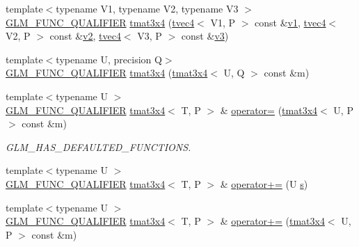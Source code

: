 \begin{DoxyCompactItemize}
\item 
{\footnotesize template$<$typename V1, typename V2, typename V3 $>$ }\\\mbox{\hyperlink{setup_8hpp_a33fdea6f91c5f834105f7415e2a64407}{G\+L\+M\+\_\+\+F\+U\+N\+C\+\_\+\+Q\+U\+A\+L\+I\+F\+I\+ER}} \mbox{\hyperlink{structglm_1_1tmat3x4_a9388a3a74c10e23d0fd00611b04d1fd0}{tmat3x4}} (\mbox{\hyperlink{structglm_1_1tvec4}{tvec4}}$<$ V1, P $>$ const \&\mbox{\hyperlink{glad_8h_a0779c3b73f9aa3a0ac5b0139b5d291d9}{v1}}, \mbox{\hyperlink{structglm_1_1tvec4}{tvec4}}$<$ V2, P $>$ const \&\mbox{\hyperlink{glad_8h_a9a09a1837922b2b806f4589096a52049}{v2}}, \mbox{\hyperlink{structglm_1_1tvec4}{tvec4}}$<$ V3, P $>$ const \&\mbox{\hyperlink{glad_8h_acc806b31cbf466ceba6555983d8b814d}{v3}})
\item 
{\footnotesize template$<$typename U, precision Q$>$ }\\\mbox{\hyperlink{setup_8hpp_a33fdea6f91c5f834105f7415e2a64407}{G\+L\+M\+\_\+\+F\+U\+N\+C\+\_\+\+Q\+U\+A\+L\+I\+F\+I\+ER}} \mbox{\hyperlink{structglm_1_1tmat3x4_a1117842438c01204536f3829257eaa12}{tmat3x4}} (\mbox{\hyperlink{structglm_1_1tmat3x4}{tmat3x4}}$<$ U, Q $>$ const \&m)
\item 
{\footnotesize template$<$typename U $>$ }\\\mbox{\hyperlink{setup_8hpp_a33fdea6f91c5f834105f7415e2a64407}{G\+L\+M\+\_\+\+F\+U\+N\+C\+\_\+\+Q\+U\+A\+L\+I\+F\+I\+ER}} \mbox{\hyperlink{structglm_1_1tmat3x4}{tmat3x4}}$<$ T, P $>$ \& \mbox{\hyperlink{structglm_1_1tmat3x4_a819a25fbfbbf505d7304adec59824063}{operator=}} (\mbox{\hyperlink{structglm_1_1tmat3x4}{tmat3x4}}$<$ U, P $>$ const \&m)
\begin{DoxyCompactList}\small\item\em G\+L\+M\+\_\+\+H\+A\+S\+\_\+\+D\+E\+F\+A\+U\+L\+T\+E\+D\+\_\+\+F\+U\+N\+C\+T\+I\+O\+NS. \end{DoxyCompactList}\item 
{\footnotesize template$<$typename U $>$ }\\\mbox{\hyperlink{setup_8hpp_a33fdea6f91c5f834105f7415e2a64407}{G\+L\+M\+\_\+\+F\+U\+N\+C\+\_\+\+Q\+U\+A\+L\+I\+F\+I\+ER}} \mbox{\hyperlink{structglm_1_1tmat3x4}{tmat3x4}}$<$ T, P $>$ \& \mbox{\hyperlink{structglm_1_1tmat3x4_a1a06efd807d1d694d6c3d6c25227f6f5}{operator+=}} (U \mbox{\hyperlink{glad_8h_af1b1d5edfea6a34daee7389b1b5810ad}{s}})
\item 
{\footnotesize template$<$typename U $>$ }\\\mbox{\hyperlink{setup_8hpp_a33fdea6f91c5f834105f7415e2a64407}{G\+L\+M\+\_\+\+F\+U\+N\+C\+\_\+\+Q\+U\+A\+L\+I\+F\+I\+ER}} \mbox{\hyperlink{structglm_1_1tmat3x4}{tmat3x4}}$<$ T, P $>$ \& \mbox{\hyperlink{structglm_1_1tmat3x4_a67a241cb6158b5d52e8530ed74ed99cd}{operator+=}} (\mbox{\hyperlink{structglm_1_1tmat3x4}{tmat3x4}}$<$ U, P $>$ const \&m)

\end{DoxyCompactItemize}
